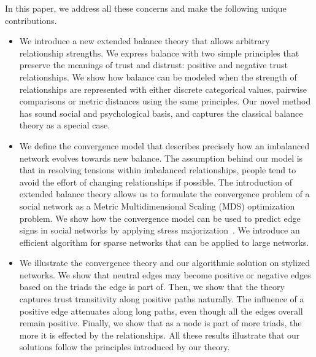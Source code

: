\documentclass[acmtweb]{acmsmall}
\begin{document}
In this paper, we  address all these concerns and make the following
unique contributions.
\begin{itemize}
\item We introduce a new extended balance theory that allows
  arbitrary relationship strengths. We express balance with two simple
  principles that preserve the meanings of trust and distrust:
  positive and negative trust relationships. We show how balance can
  be modeled when the strength of relationships are represented with either
  discrete categorical values, pairwise comparisons or metric
  distances using the same principles. Our novel method has sound
  social and psychological basis, and captures the classical balance
  theory as a special case.

\item We define the convergence model that describes precisely how an
  imbalanced network evolves towards new balance. The assumption
  behind our model is that in resolving tensions within imbalanced
  relationships, people tend to avoid the effort of changing
  relationships if possible. The introduction of extended balance
  theory allows us to formulate the convergence problem of a social
  network as a Metric Multidimensional Scaling (MDS) optimization
  problem.  We show how the convergence model can be used to predict
  edge signs in social networks by applying stress
  majorization~\cite{Gansner:05}. We introduce an efficient algorithm
  for sparse networks that can be applied to large networks.

\item We illustrate the convergence theory and our algorithmic
  solution on stylized networks. We show that neutral edges may become
  positive or negative edges based on the triads the edge is part
  of. Then, we show that the theory captures trust transitivity along
  positive paths naturally. The influence of a positive edge
  attenuates along long paths, even though all the edges overall
  remain positive. Finally, we show that as a node is part of more
  triads, the more it is effected by the relationships. All these
  results illustrate that our solutions follow the principles
  introduced by our theory.


\end{itemize}
\end{document}
